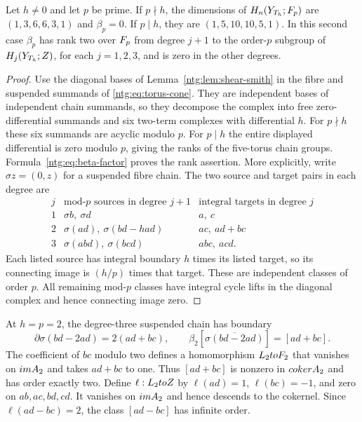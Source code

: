 \begin{proposition}\label{ntg:prop:shear-beta}
Let $h\ne0$ and let $p$ be prime. If $p\nmid h$, the dimensions
of $H_n(Y_{T_h};F_p)$ are $(1,3,6,6,3,1)$ and $\beta_p=0$.
If $p\mid h$, they are $(1,5,10,10,5,1)$.
In this second case $\beta_p$ has rank two over $F_p$ from
degree $j+1$ to the order-$p$ subgroup of $H_j(Y_{T_h};Z)$,
for each $j=1,2,3$, and is zero in the other degrees.
\end{proposition}
\begin{proof}
Use the diagonal bases of Lemma~\ref{ntg:lem:shear-smith} in the fibre
and suspended summands of \eqref{ntg:eq:torus-cone}. They are independent
bases of independent chain summands, so they decompose the complex
into free zero-differential summands and six two-term complexes with
differential $h$. For $p\nmid h$ these six summands are acyclic
modulo $p$. For $p\mid h$ the entire displayed differential is zero
modulo $p$, giving the ranks of the five-torus chain groups.
Formula~\eqref{ntg:eq:beta-factor} proves the rank assertion. More
explicitly, write $\sigma z=(0,z)$ for a suspended fibre chain.
The two source and target pairs in each degree are
\begin{equation}\label{ntg:eq:explicit-beta}
\begin{array}{c|c|c}
 j&\text{mod-$p$ sources in degree }j+1&
       \text{integral targets in degree }j\\ \hline
 1&\sigma b,\ \sigma d&a,\ c\\
 2&\sigma(ad),\ \sigma(bd-had)&ac,\ ad+bc\\
 3&\sigma(abd),\ \sigma(bcd)&abc,\ acd.
\end{array}
\end{equation}
Each listed source has integral boundary $h$ times its listed
target, so its connecting image is $(h/p)$ times that target.
These are independent classes of order $p$. All remaining
mod-$p$ classes have integral cycle lifts in the diagonal complex
and hence connecting image zero.
\end{proof}

At $h=p=2$, the degree-three suspended chain has boundary
\[
 \partial\sigma(bd-2ad)=2(ad+bc),\qquad
 \beta_2[\overline{\sigma(bd-2ad)}]=[ad+bc].
\]
The coefficient of $bc$ modulo two defines a homomorphism
$L_2toF_2$ that vanishes on $im A_2$ and takes $ad+bc$ to one.
Thus $[ad+bc]$ is nonzero in $coker A_2$ and has order exactly two.
Define $\ell:L_2toZ$ by
$\ell(ad)=1$, $\ell(bc)=-1$, and zero on $ab,ac,bd,cd$.
It vanishes on $im A_2$ and hence descends to the cokernel.
Since $\ell(ad-bc)=2$, the class $[ad-bc]$ has infinite order.

